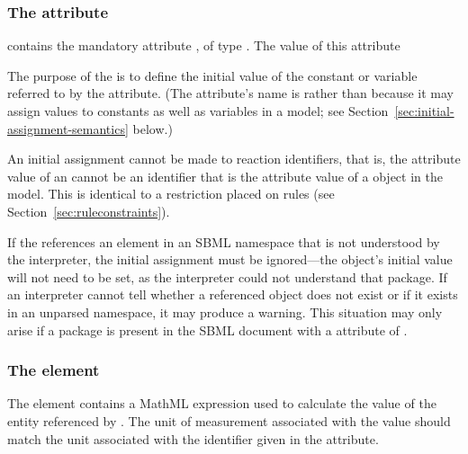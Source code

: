 \subsubsection{The  attribute}

\InitialAssignment contains the mandatory attribute
, of type .  The value of this
attribute 

The purpose of the
\InitialAssignment is to define the initial value of the constant
or variable referred to by the  attribute.  (The
attribute's name is  rather than 
because it may assign values to constants as well as variables in
a model; see Section~\ref{sec:initial-assignment-semantics}
below.)

An initial assignment cannot be made to reaction identifiers, that
is, the  attribute value of an \InitialAssignment cannot
be an identifier that is the  attribute value of a \Reaction
object in the model.  This is identical to a restriction placed on
rules (see Section~\ref{sec:ruleconstraints}).


\begin{blockChanged}
If the  references an element in an SBML namespace that is not
  understood by the interpreter, the initial assignment must be ignored---the 
  object's initial value will not need to be set, as the interpreter could not
  understand that package.  If an interpreter cannot tell whether 
  a referenced object does not exist or if it exists in an unparsed namespace,
  it may produce a warning.  This situation may only arise if a package is present in the SBML document with a  attribute of .
\end{blockChanged}

\subsubsection{The  element}

The  element contains a MathML expression used to
calculate the value of the entity referenced by .
The unit of measurement associated with the value should match the
unit associated with the identifier given in the 
attribute.


